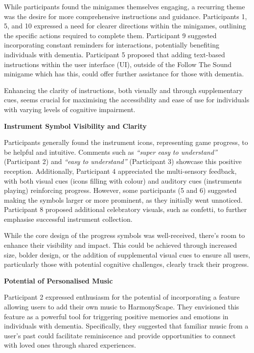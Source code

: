 \documentclass{l4proj}
\begin{document}
While participants found the minigames themselves engaging, a recurring theme was the desire for more comprehensive instructions and guidance. Participants 1, 5, and 10 expressed a need for clearer directions within the minigames, outlining the specific actions required to complete them. Participant 9 suggested incorporating constant reminders for interactions, potentially benefiting individuals with dementia. Participant 5 proposed that adding text-based instructions within the user interface (UI), outside of the Follow The Sound minigame which has this, could offer further assistance for those with dementia. 

Enhancing the clarity of instructions, both visually and through supplementary cues, seems crucial for maximising the accessibility and ease of use for individuals with varying levels of cognitive impairment.
\newline

\textbf{Instrument Symbol Visibility and Clarity}

Participants generally found the instrument icons, representing game progress, to be helpful and intuitive. Comments such as \emph{“super easy to understand”} (Participant 2) and \emph{“easy to understand”} (Participant 3) showcase this positive reception. Additionally, Participant 4 appreciated the multi-sensory feedback, with both visual cues (icons filling with colour) and auditory cues (instruments playing) reinforcing progress. However, some participants (5 and 6) suggested making the symbols larger or more prominent, as they initially went unnoticed. Participant 8 proposed additional celebratory visuals, such as confetti, to further emphasise successful instrument collection. 

While the core design of the progress symbols was well-received, there's room to enhance their visibility and impact. This could be achieved through increased size, bolder design, or the addition of supplemental visual cues to ensure all users, particularly those with potential cognitive challenges, clearly track their progress.
\newline

\textbf{Potential of Personalised Music}

Participant 2 expressed enthusiasm for the potential of incorporating a feature allowing users to add their own music to HarmonyScape. They envisioned this feature as a powerful tool for triggering positive memories and emotions in individuals with dementia. Specifically, they suggested that familiar music from a user's past could facilitate reminiscence and provide opportunities to connect with loved ones through shared experiences.
\end{document}
